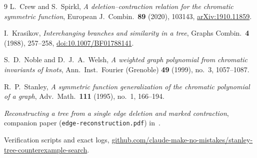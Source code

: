 \documentclass[10pt]{article}
\begin{document}
\begin{thebibliography}{9}
L.~Crew and S.~Spirkl,
\emph{A deletion--contraction relation for the chromatic symmetric function},
European J.\ Combin.\ \textbf{89} (2020), 103143,
\href{https://arxiv.org/abs/1910.11859}{arXiv:1910.11859}.

I.~Krasikov,
\emph{Interchanging branches and similarity in a tree},
Graphs Combin.\ \textbf{4} (1988), 257--258,
\href{https://doi.org/10.1007/BF01788141}{doi:10.1007/BF01788141}.

S.~D.~Noble and D.~J.~A.~Welsh,
\emph{A weighted graph polynomial from chromatic invariants of knots},
Ann.\ Inst.\ Fourier (Grenoble) \textbf{49} (1999), no.~3, 1057--1087.

R.~P.~Stanley,
\emph{A symmetric function generalization of the chromatic polynomial of a graph},
Adv.\ Math.\ \textbf{111} (1995), no.~1, 166--194.

\emph{Reconstructing a tree from a single edge deletion and marked contraction},
companion paper (\texttt{edge-reconstruction.pdf}) in~\cite{repo}.

Verification scripts and exact logs,
\href{https://github.com/claude-make-no-mistakes/stanley-tree-counterexample-search}{github.com/claude-make-no-mistakes/stanley-tree-counterexample-search}.
\end{thebibliography}
\end{document}
